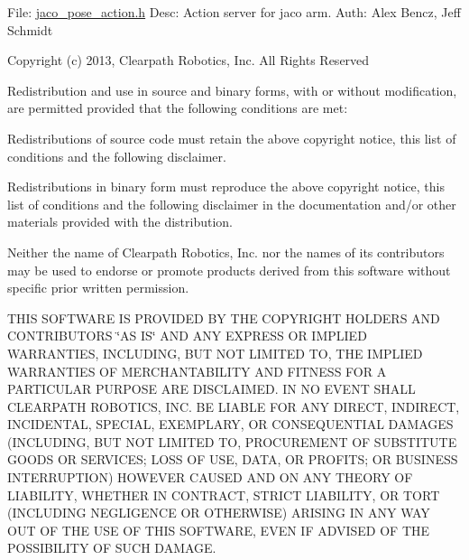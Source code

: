 File\+: \hyperlink{jaco__pose__action_8h}{jaco\+\_\+pose\+\_\+action.\+h} Desc\+: Action server for jaco arm. Auth\+: Alex Bencz, Jeff Schmidt

Copyright (c) 2013, Clearpath Robotics, Inc. All Rights Reserved

Redistribution and use in source and binary forms, with or without modification, are permitted provided that the following conditions are met\+:
\begin{DoxyItemize}
\item Redistributions of source code must retain the above copyright notice, this list of conditions and the following disclaimer.
\item Redistributions in binary form must reproduce the above copyright notice, this list of conditions and the following disclaimer in the documentation and/or other materials provided with the distribution.
\item Neither the name of Clearpath Robotics, Inc. nor the names of its contributors may be used to endorse or promote products derived from this software without specific prior written permission.
\end{DoxyItemize}

T\+H\+IS S\+O\+F\+T\+W\+A\+RE IS P\+R\+O\+V\+I\+D\+ED BY T\+HE C\+O\+P\+Y\+R\+I\+G\+HT H\+O\+L\+D\+E\+RS A\+ND C\+O\+N\+T\+R\+I\+B\+U\+T\+O\+RS \char`\"{}\+A\+S I\+S\char`\"{} A\+ND A\+NY E\+X\+P\+R\+E\+SS OR I\+M\+P\+L\+I\+ED W\+A\+R\+R\+A\+N\+T\+I\+ES, I\+N\+C\+L\+U\+D\+I\+NG, B\+UT N\+OT L\+I\+M\+I\+T\+ED TO, T\+HE I\+M\+P\+L\+I\+ED W\+A\+R\+R\+A\+N\+T\+I\+ES OF M\+E\+R\+C\+H\+A\+N\+T\+A\+B\+I\+L\+I\+TY A\+ND F\+I\+T\+N\+E\+SS F\+OR A P\+A\+R\+T\+I\+C\+U\+L\+AR P\+U\+R\+P\+O\+SE A\+RE D\+I\+S\+C\+L\+A\+I\+M\+ED. IN NO E\+V\+E\+NT S\+H\+A\+LL C\+L\+E\+A\+R\+P\+A\+TH R\+O\+B\+O\+T\+I\+CS, I\+NC. BE L\+I\+A\+B\+LE F\+OR A\+NY D\+I\+R\+E\+CT, I\+N\+D\+I\+R\+E\+CT, I\+N\+C\+I\+D\+E\+N\+T\+AL, S\+P\+E\+C\+I\+AL, E\+X\+E\+M\+P\+L\+A\+RY, OR C\+O\+N\+S\+E\+Q\+U\+E\+N\+T\+I\+AL D\+A\+M\+A\+G\+ES (I\+N\+C\+L\+U\+D\+I\+NG, B\+UT N\+OT L\+I\+M\+I\+T\+ED TO, P\+R\+O\+C\+U\+R\+E\+M\+E\+NT OF S\+U\+B\+S\+T\+I\+T\+U\+TE G\+O\+O\+DS OR S\+E\+R\+V\+I\+C\+ES; L\+O\+SS OF U\+SE, D\+A\+TA, OR P\+R\+O\+F\+I\+TS; OR B\+U\+S\+I\+N\+E\+SS I\+N\+T\+E\+R\+R\+U\+P\+T\+I\+ON) H\+O\+W\+E\+V\+ER C\+A\+U\+S\+ED A\+ND ON A\+NY T\+H\+E\+O\+RY OF L\+I\+A\+B\+I\+L\+I\+TY, W\+H\+E\+T\+H\+ER IN C\+O\+N\+T\+R\+A\+CT, S\+T\+R\+I\+CT L\+I\+A\+B\+I\+L\+I\+TY, OR T\+O\+RT (I\+N\+C\+L\+U\+D\+I\+NG N\+E\+G\+L\+I\+G\+E\+N\+CE OR O\+T\+H\+E\+R\+W\+I\+SE) A\+R\+I\+S\+I\+NG IN A\+NY W\+AY O\+UT OF T\+HE U\+SE OF T\+H\+IS S\+O\+F\+T\+W\+A\+RE, E\+V\+EN IF A\+D\+V\+I\+S\+ED OF T\+HE P\+O\+S\+S\+I\+B\+I\+L\+I\+TY OF S\+U\+CH D\+A\+M\+A\+GE.

